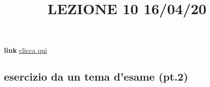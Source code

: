 \title{LEZIONE 10 16/04/20}
\textbf{link} \href{https://web.microsoftstream.com/video/23680e25-5ca6-48fc-aeb4-4cdbbee98726?list=user&userId=cfe0965d-9a7c-40e2-be6e-f078296a1914}{clicca qui}
\subsection{esercizio da un tema d'esame (pt.2)}

